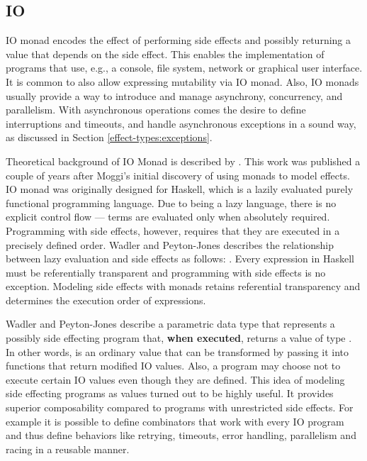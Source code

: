 \subsection{IO}
IO monad encodes the effect of performing side effects and possibly returning a value that depends on the side effect. This enables the implementation of programs that use, e.g., a console, file system, network or graphical user interface. It is common to also allow expressing mutability via IO monad. Also, IO monads usually provide a way to introduce and manage asynchrony, concurrency, and parallelism. With asynchronous operations comes the desire to define interruptions and timeouts, and handle asynchronous exceptions in a sound way, as discussed in Section \ref{effect-types:exceptions}.

Theoretical background of IO Monad is described by \textcite{imperative-fp}. This work was published a couple of years after Moggi's initial discovery of using monads to model effects. IO monad was originally designed for Haskell, which is a lazily evaluated purely functional programming language. Due to being a lazy language, there is no explicit control flow --- terms are evaluated only when absolutely required. Programming with side effects, however, requires that they are executed in a precisely defined order. Wadler and Peyton-Jones describes the relationship between lazy evaluation and side effects as follows: . Every expression in Haskell must be referentially transparent and programming with side effects is no exception. Modeling side effects with monads retains referential transparency and determines the execution order of expressions.

Wadler and Peyton-Jones describe a parametric data type  that represents a possibly side effecting program that, \textbf{when executed}, returns a value of type . In other words,  is an ordinary value that can be transformed by passing it into functions that return modified IO values. Also, a program may choose not to execute certain IO values even though they are defined. This idea of modeling side effecting programs as values turned out to be highly useful. It provides superior composability compared to programs with unrestricted side effects. For example it is possible to define combinators that work with every IO program and thus define behaviors like retrying, timeouts, error handling, parallelism and racing in a reusable manner.

